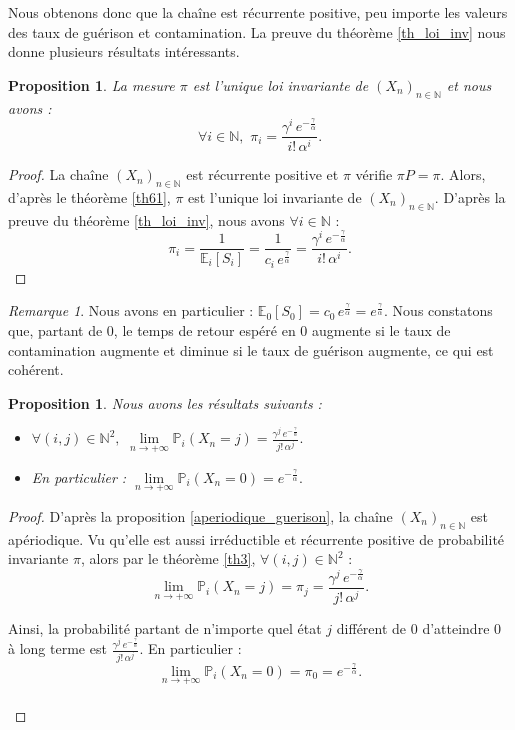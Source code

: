 \documentclass[12pt,a4paper]{report}
\newtheorem{prop}[thm]{Proposition}
\theoremstyle{remark}
\newtheorem*{remark}{Remarque}
\begin{document}
Nous obtenons donc que la chaîne est récurrente positive, peu importe les valeurs des taux de guérison et contamination. La preuve du théorème \ref{th_loi_inv} nous donne plusieurs résultats intéressants.

\begin{prop}
La mesure $\pi$ est l'unique loi invariante de $(X_n)_{n \in \mathbb{N}}$ et nous avons : $$\forall i \in \mathbb{N}, \, \, \pi_i = \frac{\gamma^i \, e^{-\frac{\gamma}{\alpha}}}{i! \, \alpha^i}.$$ 
\end{prop}
\begin{proof}
La chaîne $(X_n)_{n \in \mathbb{N}}$ est récurrente positive et $\pi$ vérifie $\pi P = \pi$. Alors, d'après le théorème \ref{th61}, $\pi$ est l'unique loi invariante de $(X_n)_{n \in \mathbb{N}}$. D'après la preuve du théorème \ref{th_loi_inv}, nous avons $\forall i \in \mathbb{N}$ :
$$\pi_i = \frac{1}{\mathbb{E}_i[S_i]} = \frac{1}{c_i \, e^{\frac{\gamma}{\alpha}}} = \frac{\gamma^i \, e^{-\frac{\gamma}{\alpha}}}{i! \, \alpha^i}.$$
\end{proof}
\begin{remark}
Nous avons en particulier : $\mathbb{E}_0[S_0] = c_0 \, e^{\frac{\gamma}{\alpha}} = e^{\frac{\gamma}{\alpha}}.$ Nous constatons que, partant de $0$, le temps de retour espéré en $0$ augmente si le taux de contamination augmente  et diminue si le taux de guérison augmente, ce qui est cohérent.
\end{remark}
\begin{prop}
Nous avons les résultats suivants :
\begin{itemize}
    \item $\forall (i,j) \in \mathbb{N}^2, \, \, \lim\limits_{n \to +\infty} \mathbb{P}_i(X_n = j) = \frac{\gamma^j \, e^{-\frac{\gamma}{\alpha}}}{j! \, \alpha^j}.$
    \item En particulier : $\lim\limits_{n \to +\infty} \mathbb{P}_i(X_n = 0) = e^{-\frac{\gamma}{\alpha}}.$
\end{itemize}
\end{prop}
\begin{proof}
D'après la proposition \ref{aperiodique_guerison}, la chaîne $(X_n)_{n \in \mathbb{N}}$ est apériodique. Vu qu'elle est aussi irréductible et récurrente positive de probabilité invariante $\pi$, alors par le théorème \ref{th3}, $\forall (i,j) \in \mathbb{N}^2$ :
$$\lim\limits_{n \to +\infty} \mathbb{P}_i(X_n = j) = \pi_j = \frac{\gamma^j \, e^{-\frac{\gamma}{\alpha}}}{j! \, \alpha^j}.$$

Ainsi, la probabilité partant de n’importe quel état $j$ différent de $0$ d’atteindre $0$ à long terme est $\frac{\gamma^j \, e^{-\frac{\gamma}{\alpha}}}{j! \, \alpha^j}$. En particulier :
$$\lim\limits_{n \to +\infty} \mathbb{P}_i(X_n = 0) = \pi_0 = e^{-\frac{\gamma}{\alpha}}.$$\\
\end{proof}
\end{document}
